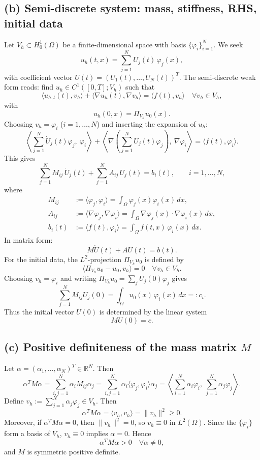 \subsection*{(b) Semi-discrete system: mass, stiffness, RHS, initial data}
Let $V_h\subset H^1_0(\Omega)$ be a finite-dimensional space with basis
$\{\varphi_i\}_{i=1}^N$. We seek
\[
    u_h(t,x) = \sum_{j=1}^N U_j(t)\,\varphi_j(x),
\]
with coefficient vector $U(t) = (U_1(t),\dots,U_N(t))^T$.
The semi-discrete weak form reads: find $u_h\in C^1([0,T];V_h)$ such that
\[
    \langle u_{h,t}(t), v_h\rangle + \langle \nabla u_h(t), \nabla v_h\rangle
    = \langle f(t), v_h\rangle
    \quad \forall v_h\in V_h,
\]
with
\[
    u_h(0,x) = \Pi_{V_h}u_0(x).
\]
Choosing $v_h = \varphi_i$ ($i=1,\dots,N$) and inserting the expansion of $u_h$:
\[
    \left\langle \sum_{j=1}^N \dot U_j(t)\varphi_j,\ \varphi_i\right\rangle
    + \left\langle \nabla\left(\sum_{j=1}^N U_j(t)\varphi_j\right),\ \nabla\varphi_i\right\rangle
    = \langle f(t), \varphi_i\rangle.
\]
This gives
\[
    \sum_{j=1}^N M_{ij}\,\dot U_j(t)
    + \sum_{j=1}^N A_{ij}\,U_j(t)
    = b_i(t), \qquad i=1,\dots,N,
\]
where
\begin{align*}
    M_{ij} & := \langle \varphi_j, \varphi_i\rangle
    = \int_\Omega \varphi_j(x)\varphi_i(x)\,dx,                  \\
    A_{ij} & := \langle \nabla\varphi_j, \nabla\varphi_i\rangle
    = \int_\Omega \nabla\varphi_j(x)\cdot\nabla\varphi_i(x)\,dx, \\
    b_i(t) & := \langle f(t), \varphi_i\rangle
    = \int_\Omega f(t,x)\,\varphi_i(x)\,dx.
\end{align*}
In matrix form:
\[
    M \dot U(t) + A U(t) = b(t).
\]
For the initial data, the $L^2$-projection $\Pi_{V_h}u_0$ is defined by
\[
    \langle \Pi_{V_h}u_0 - u_0, v_h\rangle = 0 \quad \forall v_h\in V_h.
\]
Choosing $v_h = \varphi_i$ and writing $\Pi_{V_h}u_0 = \sum_{j} U_j(0)\varphi_j$ gives
\[
    \sum_{j=1}^N M_{ij} U_j(0) = \int_\Omega u_0(x)\,\varphi_i(x)\,dx =: c_i.
\]
Thus the initial vector $U(0)$ is determined by the linear system
\[
    M U(0) = c.
\]
\subsection*{(c) Positive definiteness of the mass matrix $M$}
Let $\alpha = (\alpha_1,\dots,\alpha_N)^T \in \mathbb{R}^N$. Then
\[
    \alpha^T M \alpha
    = \sum_{i,j=1}^N \alpha_i M_{ij} \alpha_j
    = \sum_{i,j=1}^N \alpha_i \langle \varphi_j,\varphi_i\rangle \alpha_j
    = \left\langle \sum_{i=1}^N \alpha_i \varphi_i,\ \sum_{j=1}^N \alpha_j \varphi_j \right\rangle.
\]
Define $v_h := \sum_{j=1}^N \alpha_j \varphi_j \in V_h$. Then
\[
    \alpha^T M \alpha = \langle v_h, v_h\rangle = \|v_h\|^2 \ge 0.
\]
Moreover, if $\alpha^T M \alpha = 0$, then $\|v_h\|^2 = 0$, so $v_h \equiv 0$ in $L^2(\Omega)$.
Since the $\{\varphi_i\}$ form a basis of $V_h$, $v_h \equiv 0$ implies $\alpha = 0$.
Hence
\[
    \alpha^T M \alpha > 0 \quad \forall \alpha\neq 0,
\]
and $M$ is symmetric positive definite.
